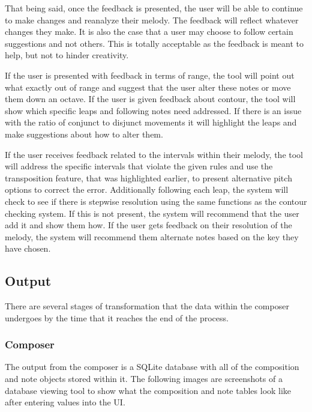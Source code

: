 That being said, once the feedback is presented, the user will be able to continue to make changes and reanalyze their melody.  The feedback will reflect whatever changes they make.  It is also the case that a user may choose to follow certain suggestions and not others.  This is totally acceptable as the feedback is meant to help, but not to hinder creativity.

\vspace{\baselineskip}

If the user is presented with feedback in terms of range, the tool will point out what exactly out of range and suggest that the user alter these notes or move them down an octave.  If the user is given feedback about contour, the tool will show which specific leaps and following notes need addressed.  If there is an issue with the ratio of conjunct to disjunct movements it will highlight the leaps and make suggestions about how to alter them.

\vspace{\baselineskip}

If the user receives feedback related to the intervals within their melody, the tool will address the specific intervals that violate the given rules and use the transposition feature, that was highlighted earlier, to present alternative pitch options to correct the error.  Additionally following each leap, the system will check to see if there is stepwise resolution using the same functions as the contour checking system.  If this is not present, the system will recommend that the user add it and show them how.  If the user gets feedback on their resolution of the melody, the system will recommend them alternate notes based on the key they have chosen.

\subsection{Output}
\label{subsec:output}

There are several stages of transformation that the data within the composer undergoes by the time that it reaches the end of the process.

\subsubsection{Composer}
\label{subsubsec:composer}

The output from the composer is a SQLite database with all of the composition and note objects stored within it.  The following images are screenshots of a database viewing tool to show what the composition and note tables look like after entering values into the UI.

